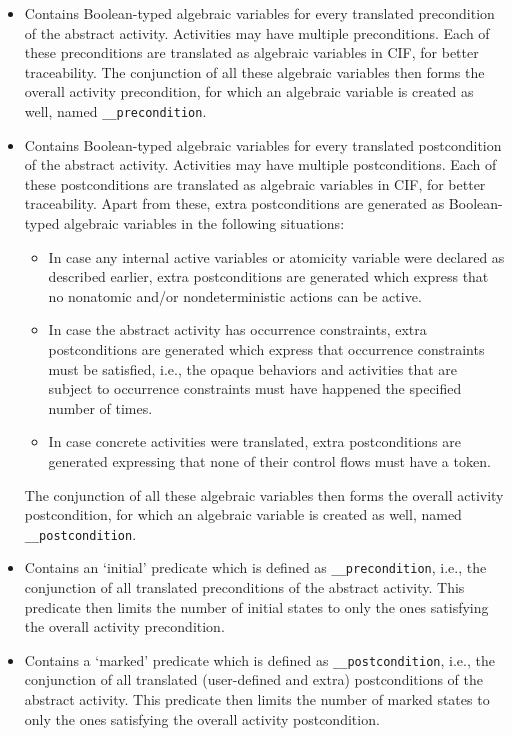 \documentclass{article}
\theoremstyle{definition}
\begin{document}
\begin{itemize}
	\item Contains Boolean-typed algebraic variables for every translated precondition of the abstract activity.
	Activities may have multiple preconditions.
	Each of these preconditions are translated as algebraic variables in CIF, for better traceability.
	The conjunction of all these algebraic variables then forms the overall activity precondition, for which an algebraic variable is created as well, named \texttt{\_\_precondition}.
	\item Contains Boolean-typed algebraic variables for every translated postcondition of the abstract activity.
	Activities may have multiple postconditions.
	Each of these postconditions are translated as algebraic variables in CIF, for better traceability.
	Apart from these, extra postconditions are generated as Boolean-typed algebraic variables in the following situations:
	\begin{itemize}
		\item In case any internal active variables or atomicity variable were declared as described earlier, extra postconditions are generated which express that no nonatomic and/or nondeterministic actions can be active.
		\item In case the abstract activity has occurrence constraints, extra postconditions are generated which express that occurrence constraints must be satisfied, i.e., the opaque behaviors and activities that are subject to occurrence constraints must have happened the specified number of times.
		\item In case concrete activities were translated, extra postconditions are generated expressing that none of their control flows must have a token.
	\end{itemize}
	The conjunction of all these algebraic variables then forms the overall activity postcondition, for which an algebraic variable is created as well, named \texttt{\_\_postcondition}.
	\item Contains an `initial' predicate which is defined as \texttt{\_\_precondition}, i.e., the conjunction of all translated preconditions of the abstract activity.
	This predicate then limits the number of initial states to only the ones satisfying the overall activity precondition.
	\item Contains a `marked' predicate which is defined as \texttt{\_\_postcondition}, i.e., the conjunction of all translated (user-defined and extra) postconditions of the abstract activity.
	This predicate then limits the number of marked states to only the ones satisfying the overall activity postcondition.

\end{itemize}
\end{document}
